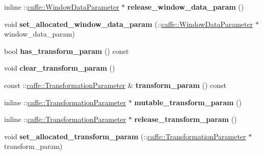 \begin{DoxyCompactItemize}
inline \+::\mbox{\hyperlink{classcaffe_1_1_window_data_parameter}{caffe\+::\+Window\+Data\+Parameter}} $\ast$ {\bfseries release\+\_\+window\+\_\+data\+\_\+param} ()
\item 
\mbox{\label{classcaffe_1_1_v1_layer_parameter_a52c7abb113b6f8db8124d0d885e566c6}} 
void {\bfseries set\+\_\+allocated\+\_\+window\+\_\+data\+\_\+param} (\+::\mbox{\hyperlink{classcaffe_1_1_window_data_parameter}{caffe\+::\+Window\+Data\+Parameter}} $\ast$window\+\_\+data\+\_\+param)
\item 
\mbox{\label{classcaffe_1_1_v1_layer_parameter_a6e22e627e9638dc642fa771c3b0e88c0}} 
bool {\bfseries has\+\_\+transform\+\_\+param} () const
\item 
\mbox{\label{classcaffe_1_1_v1_layer_parameter_a61206672389a0e9768ad3ebe8d2e56ac}} 
void {\bfseries clear\+\_\+transform\+\_\+param} ()
\item 
\mbox{\label{classcaffe_1_1_v1_layer_parameter_ae69ee6f9ca247592818f57b71963143c}} 
const \+::\mbox{\hyperlink{classcaffe_1_1_transformation_parameter}{caffe\+::\+Transformation\+Parameter}} \& {\bfseries transform\+\_\+param} () const
\item 
\mbox{\label{classcaffe_1_1_v1_layer_parameter_a848f7bc4c99d597afd3da133d20bee92}} 
inline \+::\mbox{\hyperlink{classcaffe_1_1_transformation_parameter}{caffe\+::\+Transformation\+Parameter}} $\ast$ {\bfseries mutable\+\_\+transform\+\_\+param} ()
\item 
\mbox{\label{classcaffe_1_1_v1_layer_parameter_a1c3424fa66017aae359ece32db460af4}} 
inline \+::\mbox{\hyperlink{classcaffe_1_1_transformation_parameter}{caffe\+::\+Transformation\+Parameter}} $\ast$ {\bfseries release\+\_\+transform\+\_\+param} ()
\item 
\mbox{\label{classcaffe_1_1_v1_layer_parameter_a6c2e49a1b98d745bf167d70cd062bb3a}} 
void {\bfseries set\+\_\+allocated\+\_\+transform\+\_\+param} (\+::\mbox{\hyperlink{classcaffe_1_1_transformation_parameter}{caffe\+::\+Transformation\+Parameter}} $\ast$transform\+\_\+param)

\end{DoxyCompactItemize}
